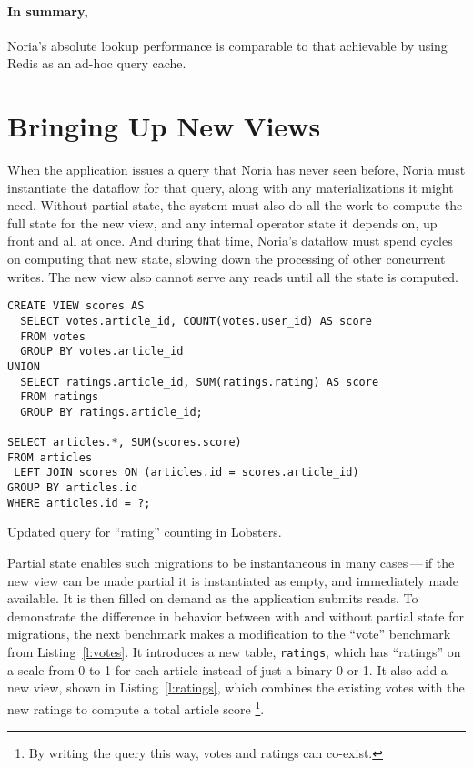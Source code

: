 \paragraph{In summary,} Noria's absolute lookup performance is comparable to
that achievable by using Redis as an ad-hoc query cache.

\section{Bringing Up New Views}
\label{s:eval:mig}

When the application issues a query that Noria has never seen before, Noria must
instantiate the dataflow for that query, along with any materializations it
might need. Without partial state, the system must also do all the work to
compute the full state for the new view, and any internal operator state it
depends on, up front and all at once. And during that time, Noria's dataflow
must spend cycles on computing that new state, slowing down the processing of
other concurrent writes. The new view also cannot serve any reads until all the
state is computed.

\begin{listing}[h]
  \begin{verbatim}
CREATE VIEW scores AS
  SELECT votes.article_id, COUNT(votes.user_id) AS score
  FROM votes
  GROUP BY votes.article_id
UNION
  SELECT ratings.article_id, SUM(ratings.rating) AS score
  FROM ratings
  GROUP BY ratings.article_id;

SELECT articles.*, SUM(scores.score)
FROM articles
 LEFT JOIN scores ON (articles.id = scores.article_id)
GROUP BY articles.id
WHERE articles.id = ?;
  \end{verbatim}
  \caption{Updated query for ``rating'' counting in Lobsters.}
  \label{l:ratings}
\end{listing}

Partial state enables such migrations to be instantaneous in many cases\,---\,if
the new view can be made partial it is instantiated as empty, and immediately
made available. It is then filled on demand as the application submits reads.
To demonstrate the difference in behavior between with and without partial state
for migrations, the next benchmark makes a modification to the ``vote''
benchmark from Listing~\ref{l:votes}. It introduces a new table,
\texttt{ratings}, which has ``ratings'' on a scale from 0 to 1 for each article
instead of just a binary 0 or 1. It also add a new view, shown in
Listing~\vref{l:ratings}, which combines the existing votes with the new ratings
to compute a total article score%
\footnote{By writing the query this way, votes and ratings can co-exist.}.

